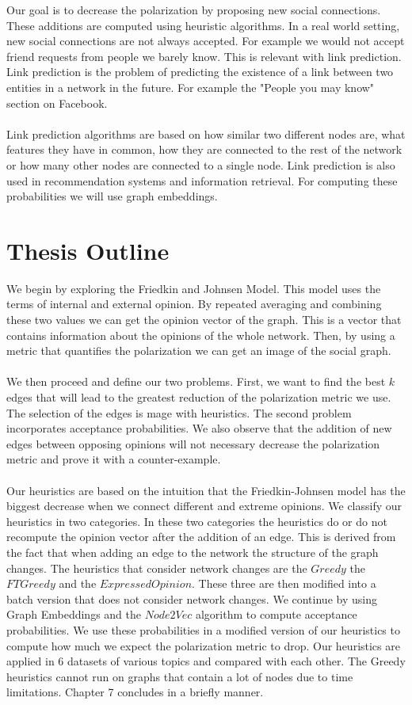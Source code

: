 \noindent Our goal is to decrease the polarization by proposing new social connections. These additions are computed using heuristic algorithms. In a real world setting, new social connections are not always accepted.  For example we would not accept friend requests from people we barely know. This is relevant with link prediction. Link prediction is the problem of predicting the existence of a link between two entities in a network in the future. For example the "People you may know" section on Facebook.		
\\		
\\		
Link prediction algorithms are based on how similar two different nodes are, what features they have in common, how they are connected to the rest of the network or how many other nodes are connected to a single node. Link prediction is also used in recommendation systems and  information retrieval. For computing these probabilities we will use graph embeddings.


\section{Thesis Outline}
\label{sec:outline}

We begin by exploring the Friedkin and Johnsen Model. This model uses the terms of internal and external opinion. By repeated averaging and combining these two values we can get the opinion vector of the graph.
This is a vector that contains information about the opinions of the whole network. Then, by using a metric that quantifies the polarization we can get an image of the social graph.
\\
\\
We then proceed and define our two problems. First, we want to find the best $k$ edges that will lead to the greatest reduction of the polarization metric we use. The selection of the edges is mage with heuristics. The second problem incorporates acceptance probabilities.
We also observe that the addition of new edges between opposing opinions will not necessary decrease the polarization metric and prove it with a counter-example.
\\
\\
Our heuristics are based on the intuition that the Friedkin-Johnsen model has the biggest decrease when we connect different and extreme opinions. We classify our heuristics in two categories. In these two categories the heuristics do or do not recompute the opinion vector after the addition of an edge. This is derived from the fact that when adding an edge to the network the structure of the graph changes. The heuristics that consider network changes are the $Greedy$ the $FTGreedy$ and the $Expressed Opinion$. These three are then modified into a batch version that does not consider network changes. We continue by using Graph Embeddings and the $Node2Vec$ algorithm to compute acceptance probabilities. We use these probabilities in a modified version of our heuristics to compute how much we expect the polarization metric to drop. Our heuristics are applied in 6 datasets of various topics and compared with each other. The Greedy heuristics cannot run on graphs that contain a lot of nodes due to time limitations. Chapter 7 concludes in a briefly manner.


